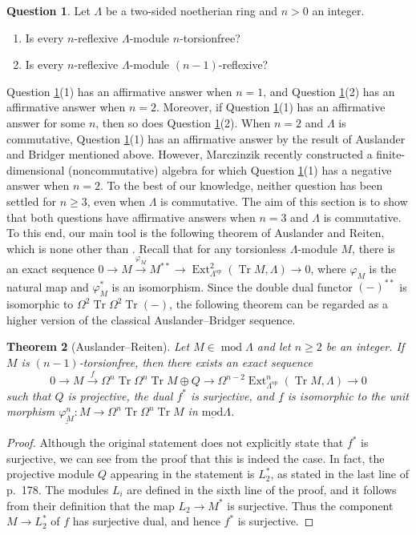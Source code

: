 \documentclass{amsart}
\newtheorem{thm}{Theorem}[section]
\theoremstyle{definition}
\newtheorem{ques}[thm]{Question}
\theoremstyle{remark}
\numberwithin{equation}{thm}
\def\Ext{\operatorname{Ext}}
\def\ge{\geqslant}
\def\lmod{\operatorname{\underline{mod}}}
\def\mod{\operatorname{mod}}
\def\syz{\Omega}
\def\tr{\operatorname{Tr}}
\begin{document}
\begin{ques}\label{ques}
Let $\Lambda$ be a two-sided noetherian ring and $n>0$ an integer.
\begin{enumerate}[\rm(1)]
   \item Is every $n$-reflexive $\Lambda$-module $n$-torsionfree?
   \item Is every $n$-reflexive $\Lambda$-module $(n-1)$-reflexive?
\end{enumerate}
\end{ques}

Question \ref{ques}(1) has an affirmative answer when $n=1$, and Question \ref{ques}(2) has an affirmative answer when $n=2$.
Moreover, if Question \ref{ques}(1) has an affirmative answer for some $n$, then so does Question \ref{ques}(2).
When $n=2$ and $\Lambda$ is commutative, Question \ref{ques}(1) has an affirmative answer by the result of Auslander and Bridger mentioned above.
However, Marczinzik \cite{Marc} recently constructed a finite-dimensional (noncommutative) algebra for which Question \ref{ques}(1) has a negative answer when $n=2$.
To the best of our knowledge, neither question has been settled for $n\ge3$, even when $\Lambda$ is commutative.
The aim of this section is to show that both questions have affirmative answers when $n=3$ and $\Lambda$ is commutative.
To this end, our main tool is the following theorem of Auslander and Reiten, which is none other than \cite[Proposition 3.6]{AR2}.
Recall that for any torsionless $\Lambda$-module $M$, there is an exact sequence
$0\to M\xrightarrow{\varphi_M}M^{\ast\ast}\to\Ext^2_{\Lambda^{\mathrm{op}}}(\tr M,\Lambda)\to0$,
where $\varphi_M$ is the natural map and $\varphi_M^\ast$ is an isomorphism.
Since the double dual functor $(-)^{\ast\ast}$ is isomorphic to $\syz^2\tr\syz^2\tr(-)$, the following theorem can be regarded as a higher version of the classical Auslander--Bridger sequence.

\begin{thm}[Auslander--Reiten]\label{EGARprop}
Let $M \in \mod\Lambda$ and let $n \ge 2$ be an integer.  
If $M$ is $(n{-}1)$-torsionfree, then there exists an exact sequence
$$
0 \to M \xrightarrow{f} \syz^n \tr \syz^n \tr M \oplus Q \to \syz^{n-2} \Ext^n_{\Lambda^{\mathrm{op}}}(\tr M, \Lambda) \to 0
$$
such that $Q$ is projective, the dual $f^\ast$ is surjective, and $\underline{f}$ is isomorphic to the unit morphism $\underline{\varphi^n_M} : M \to \syz^n \tr \syz^n \tr M$ in $\lmod\Lambda$.
\end{thm}

\begin{proof}
Although the original statement does not explicitly state that $f^\ast$ is surjective, we can see from the proof that this is indeed the case.
In fact, the projective module $Q$ appearing in the statement is $L_2^\ast$, as stated in the last line of p.~178.
The modules $L_i$ are defined in the sixth line of the proof, and it follows from their definition that the map $L_2\to M^\ast$ is surjective.
Thus the component $M\to L_2^\ast$ of $f$ has surjective dual, and hence $f^\ast$ is surjective.
\end{proof}
\end{document}
